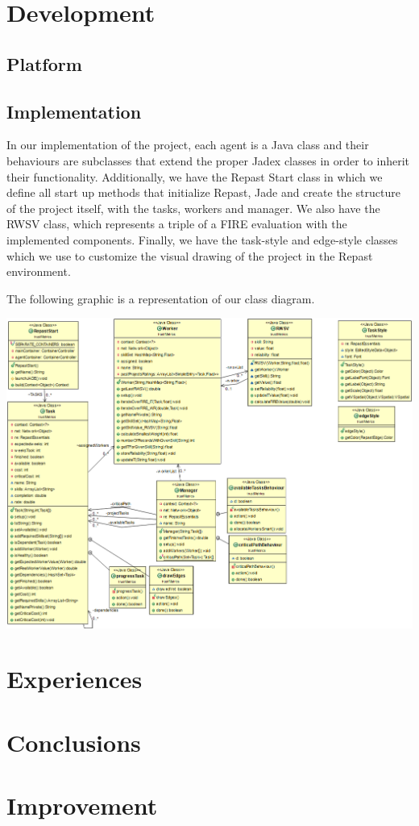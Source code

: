 \documentclass[paper=a4, fontsize=11pt]{scrartcl} %
\numberwithin{equation}{section} %
\numberwithin{figure}{section} %
\numberwithin{table}{section} %
\begin{document}
\section{Development}

\subsection{Platform}

\subsection{Implementation}
In our implementation of the project, each agent is a Java class and their behaviours are subclasses that extend the proper Jadex classes in order to inherit their functionality. Additionally, we have the Repast Start class in which we define all start up methods that initialize Repast, Jade and create the structure of the project itself, with the tasks, workers and manager. We also have the RWSV class, which represents a triple of a FIRE evaluation with the implemented components. Finally, we have the task-style and edge-style classes which we use to customize the visual drawing of the project in the Repast environment.

The following graphic is a representation of our class diagram.
\begin{center}
	\includegraphics[scale=0.4]{Model.png}
\end{center}

\section{Experiences}

\section{Conclusions}

\section{Improvement}
\end{document}
